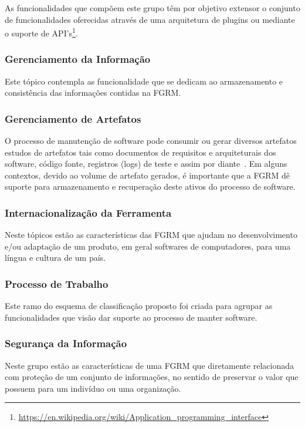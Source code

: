 As funcionalidades que compõem este grupo têm por objetivo extensor o conjunto
de funcionalidades oferecidas através de uma arquitetura de plugins ou mediante
o suporte de
API's\footnote{\url{https://en.wikipedia.org/wiki/Application_programming_interface}}.
\subsubsection{Gerenciamento da Informação}

Este tópico contempla as funcionalidade que se dedicam ao armazenamento e
consistência das informações contidas na FGRM\@.

\subsubsection{Gerenciamento de Artefatos}

O processo de manutenção de software pode consumir ou gerar diversos artefatos
estudos de artefatos tais como documentos de requisitos e arquiteturais dos
software, código fonte, registros (logs) de teste e assim por
diante~\cite{cavalcanti2013bug}. Em alguns contextos, devido ao volume de
artefato gerados, é importante que a FGRM dê suporte para armazenamento e
recuperação deste ativos do processo de software.

\subsubsection{Internacionalização da Ferramenta}

Neste tópicos estão as características das FGRM que ajudam no desenvolvimento
e/ou adaptação de um produto, em geral softwares de computadores, para uma
língua e cultura de um país.

\subsubsection{Processo de Trabalho}
 Este ramo do esquema de classificação proposto foi criada para
 agrupar as funcionalidades que visão dar suporte ao processo de manter
 software.

\subsubsection{Segurança da Informação}

Neste grupo estão as características de uma FGRM que diretamente relacionada com
proteção de um conjunto de informações, no sentido de preservar o valor que
possuem para um indivíduo ou uma organização.

